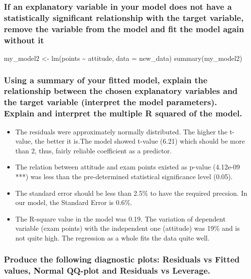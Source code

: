 \documentclass[]{article}
\begin{document}
\subsubsection{If an explanatory variable in your model does not have a
statistically significant relationship with the target variable, remove
the variable from the model and fit the model again without
it}\label{if-an-explanatory-variable-in-your-model-does-not-have-a-statistically-significant-relationship-with-the-target-variable-remove-the-variable-from-the-model-and-fit-the-model-again-without-it}

my\_model2 \textless{}- lm(points \textasciitilde{} attitude, data =
new\_data) summary(my\_model2)

\subsubsection{Using a summary of your fitted model, explain the
relationship between the chosen explanatory variables and the target
variable (interpret the model parameters). Explain and interpret the
multiple R squared of the
model.}\label{using-a-summary-of-your-fitted-model-explain-the-relationship-between-the-chosen-explanatory-variables-and-the-target-variable-interpret-the-model-parameters.-explain-and-interpret-the-multiple-r-squared-of-the-model.}

\begin{itemize}
\item
  The residuals were approximately normally distributed. The higher the
  t-value, the better it is.The model showed t-value (6.21) which should
  be more than 2, thus, fairly reliable coefficient as a predictor.
\item
  The relation between attitude and exam points existed as p-value
  (4.12e-09 ***) was less than the pre-determined statistical
  significance level (0.05).
\item
  The standard error should be less than 2.5\% to have the required
  precsion. In our model, the Standard Error is 0.6\%.
\item
  The R-square value in the model was 0.19. The variation of dependent
  variable (exam points) with the independent one (attitude) was 19\%
  and is not quite high. The regression as a whole fits the data quite
  well.
\end{itemize}

\subsubsection{Produce the following diagnostic plots: Residuals vs
Fitted values, Normal QQ-plot and Residuals vs
Leverage.}\label{produce-the-following-diagnostic-plots-residuals-vs-fitted-values-normal-qq-plot-and-residuals-vs-leverage.}
\end{document}
